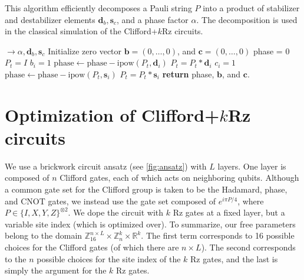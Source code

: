 \documentclass[a4paper,accepted=2024-07-10]{quantumarticle}
\begin{document}
\begin{algorithm}[H]
\caption{Pauli decomposition algorithm.}\label{algo:pauli-decom}
This algorithm efficiently decomposes a Pauli string $P$ into a product of stabilizer and destabilizer elements $\mathbf{d}_b,\mathbf{s}_{c}$, and a phase factor $\alpha$. The decomposition is used in the classical simulation of the Clifford+$k$Rz circuits.
\begin{algorithmic}[1]
  $\rightarrow \alpha, \mathbf{d}_b,\mathbf{s}_{c}$
    \State Initialize zero vector $\mathbf{b}=(0,\dots,0)$, and $\mathbf{c}=(0,\dots,0)$
    \State phase = 0
    \State $P_{t}=I$ 
     
        \State $b_i = 1$
        \State $\text{phase} \gets \text{phase} - \text{ipow}(P_t,\mathbf{d}_i)$
        \State $P_t=P_t*\mathbf{d}_i$
        \EndIf
    \EndFor
     
    \State $c_i = 1$
    \State $\text{phase} \gets \text{phase} - \text{ipow}(P_t,\mathbf{s}_i)$
        \State $P_t=P_t*\mathbf{s}_i$
    \EndIf
    \EndFor
    \State \textbf{return} phase, $\mathbf{b}$, and $\mathbf{c}$.
  \EndProcedure
\end{algorithmic}
\end{algorithm}


\section{\label{app:optimization} Optimization of Clifford+\texorpdfstring{$k$}{k}Rz circuits}
We use a brickwork circuit ansatz (see \cref{fig:ansatz}) with $L$ layers. One layer is composed of $n$ Clifford gates, each of which acts on neighboring qubits. Although a common gate set for the Clifford group is taken to be the Hadamard, phase, and CNOT gates, we instead use the gate set composed of $e^{i \pi P/4}$, where $P \in \{I,X,Y,Z\}^{\otimes 2}$. We dope the circuit with $k$ Rz gates at a fixed layer, but a variable site index (which is optimized over). To summarize, our free parameters belong to the domain $\mathbb{Z}_{16}^{n \times L} \times \mathbb{Z}_n^{k} \times \mathbb{R}^k$. The first term corresponds to 16 possible choices for the Clifford gates (of which there are $n \times L$). The second corresponds to the $n$ possible choices for the site index of the $k$ Rz gates, and the last is simply the argument for the $k$ Rz gates.
\end{document}
